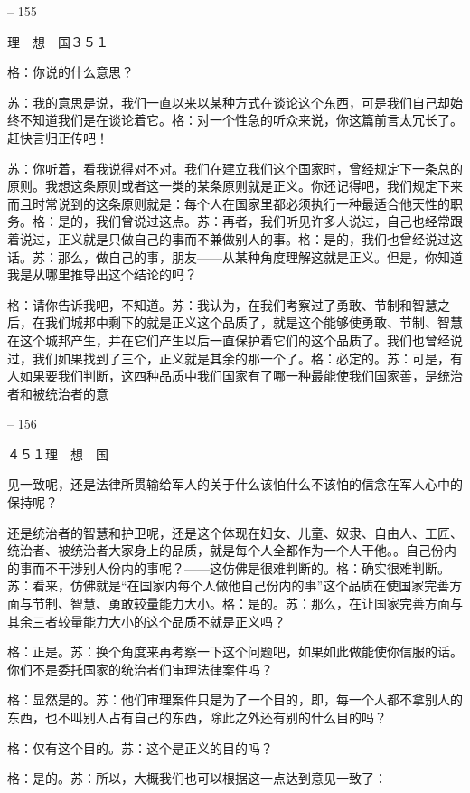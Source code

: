\documentclass[11pt,oneside]{book}
\begin{document}
\begin{common-format}
    

-- 155

    理　想　国３５１

    格：你说的什么意思？

    苏：我的意思是说，我们一直以来以某种方式在谈论这个东西，可是我们自己却始终不知道我们是在谈论着它。格：对一个性急的听众来说，你这篇前言太冗长了。赶快言归正传吧！

    苏：你听着，看我说得对不对。我们在建立我们这个国家时，曾经规定下一条总的原则。我想这条原则或者这一类的某条原则就是正义。你还记得吧，我们规定下来而且时常说到的这条原则就是：每个人在国家里都必须执行一种最适合他天性的职务。格：是的，我们曾说过这点。苏：再者，我们听见许多人说过，自己也经常跟着说过，正义就是只做自己的事而不兼做别人的事。格：是的，我们也曾经说过这话。苏：那么，做自己的事，朋友——从某种角度理解这就是正义。但是，你知道我是从哪里推导出这个结论的吗？

    格：请你告诉我吧，不知道。苏：我认为，在我们考察过了勇敢、节制和智慧之后，在我们城邦中剩下的就是正义这个品质了，就是这个能够使勇敢、节制、智慧在这个城邦产生，并在它们产生以后一直保护着它们的这个品质了。我们也曾经说过，我们如果找到了三个，正义就是其余的那一个了。格：必定的。苏：可是，有人如果要我们判断，这四种品质中我们国家有了哪一种最能使我们国家善，是统治者和被统治者的意

    

-- 156

    ４５１理　想　国

    见一致呢，还是法律所贯输给军人的关于什么该怕什么不该怕的信念在军人心中的保持呢？

    还是统治者的智慧和护卫呢，还是这个体现在妇女、儿童、奴隶、自由人、工匠、统治者、被统治者大家身上的品质，就是每个人全都作为一个人干他。。自己份内的事而不干涉别人份内的事呢？——这仿佛是很难判断的。格：确实很难判断。苏：看来，仿佛就是“在国家内每个人做他自己份内的事”这个品质在使国家完善方面与节制、智慧、勇敢较量能力大小。格：是的。苏：那么，在让国家完善方面与其余三者较量能力大小的这个品质不就是正义吗？

    格：正是。苏：换个角度来再考察一下这个问题吧，如果如此做能使你信服的话。你们不是委托国家的统治者们审理法律案件吗？

    格：显然是的。苏：他们审理案件只是为了一个目的，即，每一个人都不拿别人的东西，也不叫别人占有自己的东西，除此之外还有别的什么目的吗？

    格：仅有这个目的。苏：这个是正义的目的吗？

    格：是的。苏：所以，大概我们也可以根据这一点达到意见一致了：


\end{common-format}
\end{document}
